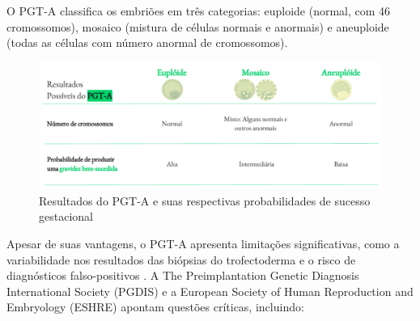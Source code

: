 O PGT-A classifica os embriões em três categorias: euploide (normal, com 46 cromossomos), mosaico (mistura de células normais e anormais) e aneuploide (todas as células com número anormal de cromossomos). 

\begin{center}
    \begin{figure}[h]
        \captionsetup{font=footnotesize, position=above}
        \caption{Resultados do PGT-A e suas respectivas probabilidades de sucesso gestacional}
        \label{fig:ResultadosPGT}
        \centering
        \includegraphics[scale=0.5]{figuras/ResultadosPGT.pdf}
        \vspace{0.3cm} 
    \end{figure}
\end{center}
\FloatBarrier

Apesar de suas vantagens, o PGT-A apresenta limitações significativas, como a variabilidade nos resultados das biópsias do trofectoderma e o risco de diagnósticos falso-positivos \cite{gleicher2021}. A The Preimplantation Genetic Diagnosis International Society (PGDIS) e a European Society of Human Reproduction and Embryology (ESHRE) apontam questões críticas, incluindo:

